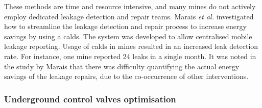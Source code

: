 	 	 These methods are time and resource intensive, and many mines do not actively employ dedicated leakage detection and repair teams. Marais \textit{et al.} \cite{marais2009increased} investigated how to streamline the leakage detection and repair process to increase energy savings by using a \gls{calds}. The system was developed to allow centralised mobile leakage reporting. Usage of \gls{calds} in mines resulted in an increased leak detection rate. For instance, one mine reported 24 leaks in a single month. It was noted in the study by Marais that there was difficulty quantifying the actual energy savings of the leakage repairs, due to the co-occurrence of other interventions.	
		 
		 \subsubsection{Underground control valves optimisation}
		 
